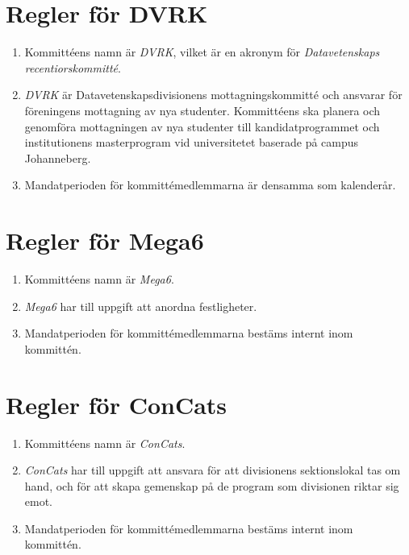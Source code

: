 \documentclass{dvd}
\begin{document}
\section{Regler för DVRK}

\begin{enumerate}[label=\arabic* §, ref=\arabic*]
	\item Kommittéens namn är \emph{DVRK}, vilket är en akronym för \emph{Datavetenskaps recentiorskommitté}.

	\item \emph{DVRK} är Datavetenskapsdivisionens mottagningskommitté och ansvarar för föreningens mottagning av nya studenter.
	      Kommittéens ska planera och genomföra mottagningen av nya studenter till kandidatprogrammet och institutionens masterprogram vid universitetet baserade på campus Johanneberg.

	\item Mandatperioden för kommittémedlemmarna är densamma som kalenderår.

\end{enumerate}

\section{Regler för Mega6}

\begin{enumerate}[label=\arabic* §, ref=\arabic*]
	\item Kommittéens namn är \emph{Mega6}.

	\item \emph{Mega6} har till uppgift att anordna festligheter.

	\item Mandatperioden för kommittémedlemmarna bestäms internt inom kommittén.

\end{enumerate}

\section{Regler för ConCats}

\begin{enumerate}[label=\arabic* §, ref=\arabic*]
	\item Kommittéens namn är \emph{ConCats}.

	\item \emph{ConCats} har till uppgift att ansvara för att divisionens sektionslokal tas om hand, och för att skapa gemenskap på de program som divisionen riktar sig emot.

	\item Mandatperioden för kommittémedlemmarna bestäms internt inom kommittén.

\end{enumerate}
\end{document}
